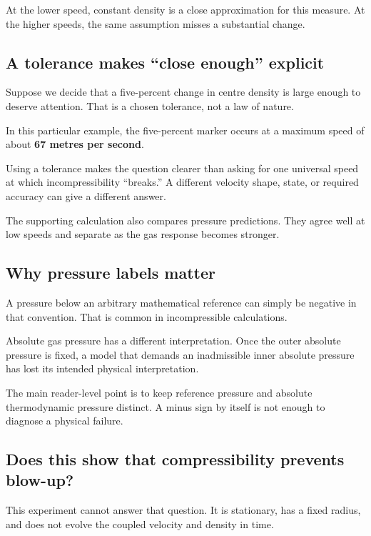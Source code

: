 \documentclass[
  english,
  11pt,
]{article}
\begin{document}
At the lower speed, constant density is a close approximation for this
measure. At the higher speeds, the same assumption misses a substantial
change.

\subsection{A tolerance makes ``close enough''
explicit}\label{a-tolerance-makes-close-enough-explicit}

Suppose we decide that a five-percent change in centre density is large
enough to deserve attention. That is a chosen tolerance, not a law of
nature.

In this particular example, the five-percent marker occurs at a maximum
speed of about \textbf{67 metres per second}.

Using a tolerance makes the question clearer than asking for one
universal speed at which incompressibility ``breaks.'' A different
velocity shape, state, or required accuracy can give a different answer.

The supporting calculation also compares pressure predictions. They
agree well at low speeds and separate as the gas response becomes
stronger.

\subsection{Why pressure labels
matter}\label{why-pressure-labels-matter}

A pressure below an arbitrary mathematical reference can simply be
negative in that convention. That is common in incompressible
calculations.

Absolute gas pressure has a different interpretation. Once the outer
absolute pressure is fixed, a model that demands an inadmissible inner
absolute pressure has lost its intended physical interpretation.

The main reader-level point is to keep reference pressure and absolute
thermodynamic pressure distinct. A minus sign by itself is not enough to
diagnose a physical failure.

\subsection{Does this show that compressibility prevents
blow-up?}\label{does-this-show-that-compressibility-prevents-blow-up}

This experiment cannot answer that question. It is stationary, has a
fixed radius, and does not evolve the coupled velocity and density in
time.
\end{document}
